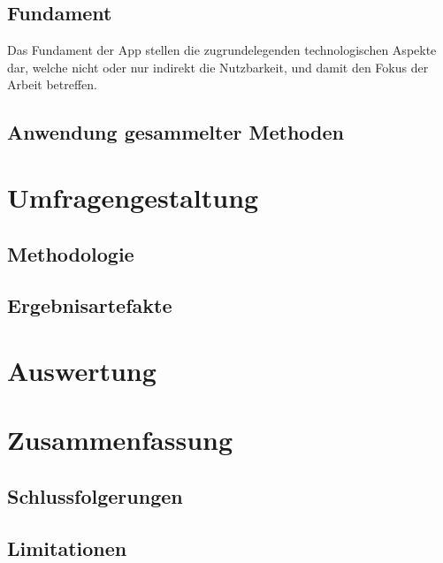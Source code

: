 \documentclass[oneside,bibliography=totocnumbered,BCOR=5mm]{scrbook}
\begin{document}
\section{Fundament}

Das Fundament der App stellen die zugrundelegenden technologischen Aspekte dar,
welche nicht oder nur indirekt die Nutzbarkeit, und damit den Fokus der Arbeit
betreffen.

\section{Anwendung gesammelter Methoden}

\chapter{Umfragengestaltung}
\section{Methodologie}
\section{Ergebnisartefakte}

\chapter{Auswertung}

\chapter{Zusammenfassung}
\section{Schlussfolgerungen}
\section{Limitationen}
\end{document}

